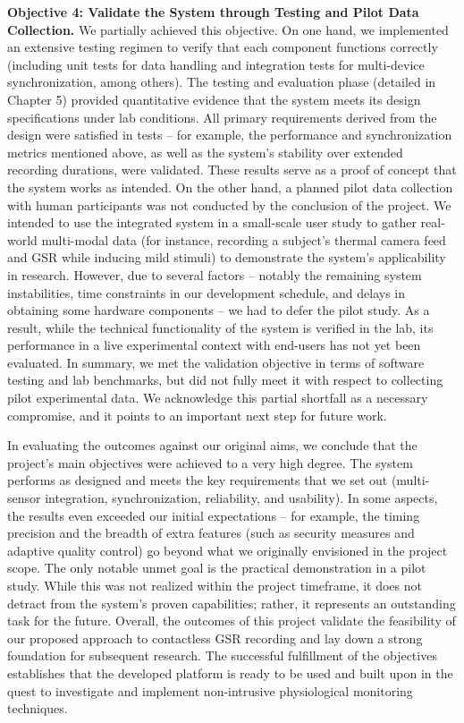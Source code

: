 \textbf{Objective 4: Validate the System through Testing and Pilot Data Collection.} We partially achieved this objective. On one hand, we implemented an extensive testing regimen to verify that each component functions correctly (including unit tests for data handling and integration tests for multi-device synchronization, among others). The testing and evaluation phase (detailed in Chapter 5) provided quantitative evidence that the system meets its design specifications under lab conditions. All primary requirements derived from the design were satisfied in tests -- for example, the performance and synchronization metrics mentioned above, as well as the system's stability over extended recording durations, were validated. These results serve as a proof of concept that the system works as intended. On the other hand, a planned pilot data collection with human participants was not conducted by the conclusion of the project. We intended to use the integrated system in a small-scale user study to gather real-world multi-modal data (for instance, recording a subject's thermal camera feed and GSR while inducing mild stimuli) to demonstrate the system's applicability in research. However, due to several factors -- notably the remaining system instabilities, time constraints in our development schedule, and delays in obtaining some hardware components -- we had to defer the pilot study. As a result, while the technical functionality of the system is verified in the lab, its performance in a live experimental context with end-users has not yet been evaluated. In summary, we met the validation objective in terms of software testing and lab benchmarks, but did not fully meet it with respect to collecting pilot experimental data. We acknowledge this partial shortfall as a necessary compromise, and it points to an important next step for future work.

In evaluating the outcomes against our original aims, we conclude that the project's main objectives were achieved to a very high degree. The system performs as designed and meets the key requirements that we set out (multi-sensor integration, synchronization, reliability, and usability). In some aspects, the results even exceeded our initial expectations -- for example, the timing precision and the breadth of extra features (such as security measures and adaptive quality control) go beyond what we originally envisioned in the project scope. The only notable unmet goal is the practical demonstration in a pilot study. While this was not realized within the project timeframe, it does not detract from the system's proven capabilities; rather, it represents an outstanding task for the future. Overall, the outcomes of this project validate the feasibility of our proposed approach to contactless GSR recording and lay down a strong foundation for subsequent research. The successful fulfillment of the objectives establishes that the developed platform is ready to be used and built upon in the quest to investigate and implement non-intrusive physiological monitoring techniques.


